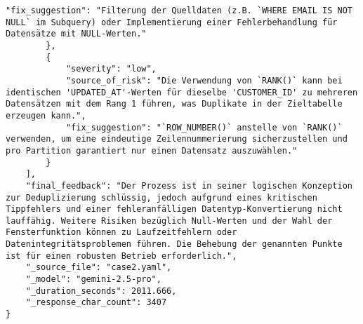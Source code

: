 \begin{lstlisting}[caption={Ausgabe: GEMINI 2.5 Pro Anwendungsfall 2 Konsistenzdurchlauf},label={gemini_case2_prompt2}]
            "fix_suggestion": "Filterung der Quelldaten (z.B. `WHERE EMAIL IS NOT NULL` im Subquery) oder Implementierung einer Fehlerbehandlung für Datensätze mit NULL-Werten."
        },
        {
            "severity": "low",
            "source_of_risk": "Die Verwendung von `RANK()` kann bei identischen 'UPDATED_AT'-Werten für dieselbe 'CUSTOMER_ID' zu mehreren Datensätzen mit dem Rang 1 führen, was Duplikate in der Zieltabelle erzeugen kann.",
            "fix_suggestion": "`ROW_NUMBER()` anstelle von `RANK()` verwenden, um eine eindeutige Zeilennummerierung sicherzustellen und pro Partition garantiert nur einen Datensatz auszuwählen."
        }
    ],
    "final_feedback": "Der Prozess ist in seiner logischen Konzeption zur Deduplizierung schlüssig, jedoch aufgrund eines kritischen Tippfehlers und einer fehleranfälligen Datentyp-Konvertierung nicht lauffähig. Weitere Risiken bezüglich Null-Werten und der Wahl der Fensterfunktion können zu Laufzeitfehlern oder Datenintegritätsproblemen führen. Die Behebung der genannten Punkte ist für einen robusten Betrieb erforderlich.",
    "_source_file": "case2.yaml",
    "_model": "gemini-2.5-pro",
    "_duration_seconds": 2011.666,
    "_response_char_count": 3407
}
\end{lstlisting}

